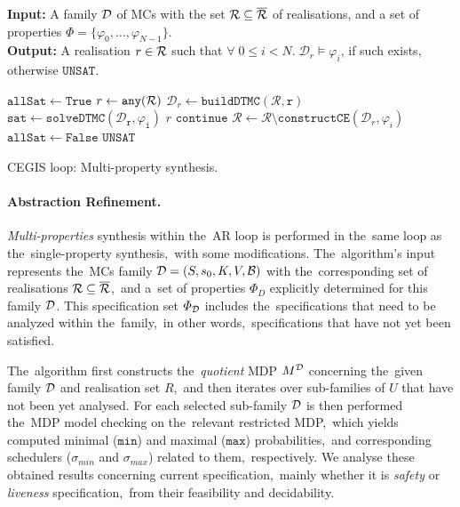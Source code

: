 \begin{algorithm}[h!]
\hspace*{\algorithmicindent} \textbf{Input:} A family $\mathcal{D}$ of MCs with the set $\mathcal{R} \subseteq \overline{\mathcal{R}}$ of realisations, and a set of properties $\varPhi = \{ \varphi_0, \dots, \varphi_{N-1} \}$. \\
\hspace*{\algorithmicindent} \textbf{Output:}  A realisation $r \in \mathcal{R}$ such that $\forall \; 0 \leq i < N. \; \mathcal{D}_r \models \varphi_i$, if such exists, otherwise $\mathtt{UNSAT}$. \\
\vspace*{-1.5em}
\begin{algorithmic}[1]
    \WHILE{$\rlz \neq \emptyset$}
        \STATE $\mathtt{allSat} \leftarrow \mathtt{True}$
        \STATE $r \leftarrow \mathtt{any(\mathcal{R})}$
        \STATE $\mathcal{D}_r\leftarrow \mathtt{buildDTMC(\mathcal{R}, r)}$
            \STATE $\mathtt{sat} \leftarrow \mathtt{solveDTMC(\mathcal{D}_r, \varphi_{i})}$
                    \RETURN $r$
                \ELSE
                    \STATE $\mathtt{continue}$
                \ENDIF
            \ELSE
                \STATE $\mathcal{R} \leftarrow \mathcal{R} \setminus \mathtt{constructCE}(\mathcal{D}_r, \varphi_{i})$
                \STATE $\mathtt{allSat} \leftarrow \mathtt{False}$
            \ENDIF
        \ENDFOR
    \ENDWHILE
    \RETURN $\mathtt{UNSAT}$
\end{algorithmic}
\caption{CEGIS loop: Multi-property synthesis.}
\label{alg:cegis_multi}
\end{algorithm}

\paragraph{Abstraction Refinement.}
\textit{Multi-properties} synthesis within the~AR loop is performed in the~same loop as the~single-property synthesis,~with some modifications.
The~algorithm's input represents the~MCs family $\mathcal{D} = (S,s_{0},K, V, \mathcal{B})$ with the~corresponding set of realisations $\mathcal{R} \subseteq \overline{\mathcal{R}}$,~and a~set of properties $\varPhi_D$ explicitly determined for this family $\mathcal{D}$.
This specification set $\varPhi_{\mathcal{D}}$ includes the~specifications that need to be analyzed within the~family,~in other words,~specifications that have not yet been satisfied.

The~algorithm first constructs the~\textit{quotient} MDP $M^{\mathcal{D}}$ concerning the~given family $\mathcal{D}$ and realisation set $R$,~and then iterates over sub-families of $U$ that have not been yet analysed.
For each selected sub-family $\mathcal{D}$ is then performed the~MDP model checking on the~relevant restricted MDP,~which yields computed minimal ($\mathtt{min}$) and maximal ($\mathtt{max}$) probabilities,~and corresponding schedulers ($\sigma_{min}$ and $\sigma_{max}$) related to them,~respectively.
We analyse these obtained results concerning current specification,~mainly whether it is \textit{safety} or \textit{liveness} specification,~from their feasibility and decidability.

